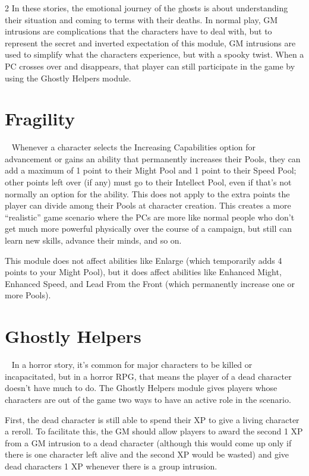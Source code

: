 \begin{multicols}{2}
In these stories, the emotional journey of the ghosts is about understanding their situation and coming to terms with their deaths. In normal play, GM intrusions are complications that the characters have to deal with, but to represent the secret and inverted expectation of this module, GM intrusions are used to simplify what the characters experience, but with a spooky twist.
When a PC crosses over and disappears, that player can still participate in the game by using the Ghostly Helpers module.

\section{Fragility}
 
Whenever a character selects the Increasing Capabilities option for advancement or gains an ability that permanently increases their Pools, they can add a maximum of 1 point to their Might Pool and 1 point to their Speed Pool; other points left over (if any) must go to their Intellect Pool, even if that’s not normally an option for the ability. This does not apply to the extra points the player can divide among their Pools at character creation. This creates a more “realistic” game scenario where the PCs are more like normal people who don’t get much more powerful physically over the course of a campaign, but still can learn new skills, advance their minds, and so on.

This module does not affect abilities like Enlarge (which temporarily adds 4 points to your Might Pool), but it does affect abilities like Enhanced Might, Enhanced Speed, and Lead From the Front (which permanently increase one or more Pools).

\section{Ghostly Helpers}
 
In a horror story, it’s common for major characters to be killed or incapacitated, but in a horror RPG, that means the player of a dead character doesn’t have much to do. The Ghostly Helpers module gives players whose characters are out of the game two ways to have an active role in the scenario.

First, the dead character is still able to spend their XP to give a living character a reroll. To facilitate this, the GM should allow players to award the second 1 XP from a GM intrusion to a dead character (although this would come up only if there is one character left alive and the second XP would be wasted) and give dead characters 1 XP whenever there is a group intrusion.


\end{multicols}
